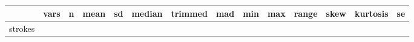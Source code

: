 \documentclass[
]{article}
\begin{document}
\begin{longtable}[]{@{}lrrrrrrrrrrrrr@{}}
\toprule
\begin{minipage}[b]{0.05\columnwidth}\raggedright
\strut
\end{minipage} & \begin{minipage}[b]{0.03\columnwidth}\raggedleft
vars\strut
\end{minipage} & \begin{minipage}[b]{0.04\columnwidth}\raggedleft
n\strut
\end{minipage} & \begin{minipage}[b]{0.05\columnwidth}\raggedleft
mean\strut
\end{minipage} & \begin{minipage}[b]{0.05\columnwidth}\raggedleft
sd\strut
\end{minipage} & \begin{minipage}[b]{0.05\columnwidth}\raggedleft
median\strut
\end{minipage} & \begin{minipage}[b]{0.05\columnwidth}\raggedleft
trimmed\strut
\end{minipage} & \begin{minipage}[b]{0.05\columnwidth}\raggedleft
mad\strut
\end{minipage} & \begin{minipage}[b]{0.04\columnwidth}\raggedleft
min\strut
\end{minipage} & \begin{minipage}[b]{0.05\columnwidth}\raggedleft
max\strut
\end{minipage} & \begin{minipage}[b]{0.05\columnwidth}\raggedleft
range\strut
\end{minipage} & \begin{minipage}[b]{0.05\columnwidth}\raggedleft
skew\strut
\end{minipage} & \begin{minipage}[b]{0.06\columnwidth}\raggedleft
kurtosis\strut
\end{minipage} & \begin{minipage}[b]{0.04\columnwidth}\raggedleft
se\strut
\end{minipage}\tabularnewline
\midrule
\endhead
\begin{minipage}[t]{0.05\columnwidth}\raggedright
strokes\strut
\end{minipage} & \begin{minipage}[t]{0.03\columnwidth}\raggedleft
1\strut
\end{minipage} & \begin{minipage}[t]{0.04\columnwidth}\raggedleft

\end{minipage}
\end{longtable}
\end{document}
